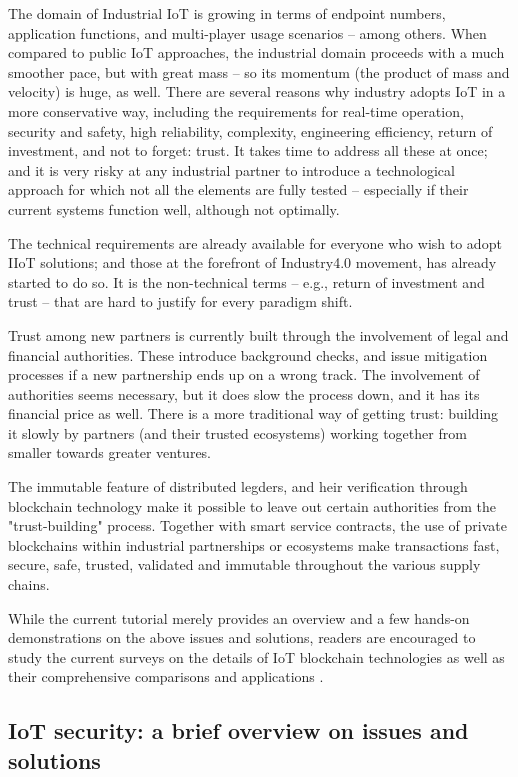 \documentclass[a4paper]{article}
\begin{document}
The domain of Industrial IoT is growing in terms of endpoint numbers, application functions, and multi-player usage scenarios -- among others. When compared to public IoT approaches, the industrial domain proceeds with a much smoother pace, but with great mass -- so its momentum (the product of mass and velocity) is huge, as well. There are several reasons why industry adopts IoT in a more conservative way, including the requirements for real-time operation, security and safety, high reliability, complexity, engineering efficiency, return of investment, and not to forget: trust. It takes time to address all these at once; and it is very risky at any industrial partner to introduce a technological approach for which not all the elements are fully tested -- especially if their current systems function well, although not optimally.

The technical requirements are already available for everyone who wish to adopt IIoT solutions; and those at the forefront of Industry4.0 movement, has already started to do so. It is the non-technical terms -- e.g., return of investment and trust -- that are hard to justify for every paradigm shift.

Trust among new partners is currently built through the involvement of legal and financial authorities. These introduce background checks, and issue mitigation processes if a new partnership ends up on a wrong track. The involvement of authorities seems necessary, but it does slow the process down, and it has its financial price as well. There is a more traditional way of getting trust: building it slowly by partners (and their trusted ecosystems) working together from smaller towards greater ventures.

The immutable feature of distributed legders, and heir verification through blockchain technology make it possible to leave out certain authorities from the "trust-building" process. Together with smart service contracts, the use of private blockchains within industrial partnerships or ecosystems make transactions fast, secure, safe, trusted, validated and immutable throughout the various supply chains. 

While the current tutorial merely provides an overview and a few hands-on demonstrations on the above issues and solutions, readers are encouraged to study the current surveys on the details of IoT blockchain technologies \cite{BC_IoT_survey} as well as their comprehensive comparisons and applications \cite{BC_IoT_comprehensive}.

\subsection{IoT security: a brief overview on issues and solutions}
\end{document}
